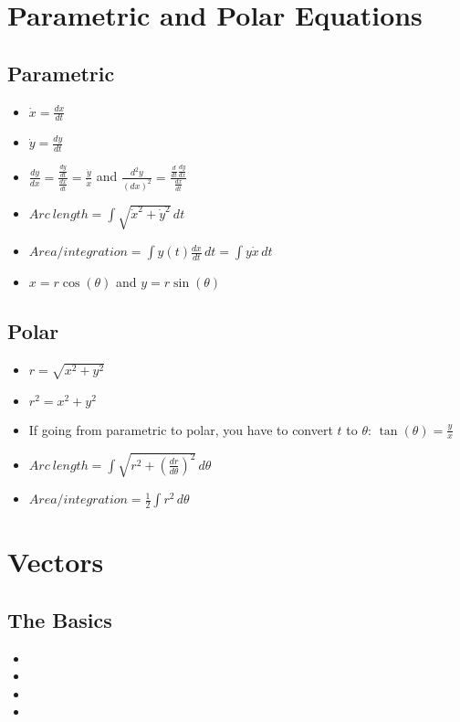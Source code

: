 \documentclass{article}
\begin{document}
\section*{Parametric and Polar Equations}
  \subsection*{Parametric}
  \begin{itemize}
   \Large \item \( \dot{x}=\frac{dx}{dt}\)\\
   \item \( \dot{y}=\frac{dy}{dt}\)\\
   \item
     \(\frac{dy}{dx}=\frac{\frac{dy}{dt}}{\frac{dx}{dt}}=\frac{\dot{y}}{\dot{x}}\) 
      and \huge
     \( \frac{d^2y}{\left(dx\right)^2} = \frac{\frac{d}{dt}\frac{dy}{dx}}{\frac{dx}{dt}} \)\\
   \normalsize
   \item \(Arc ~ length = \int\sqrt{\dot{x}^2+\dot{y}^2} \, dt\)\\
   \item \(Area/integration = \int y(t) \frac{dx}{dt} \, dt = \int y \dot{x} \, dt \)\\
   \item \(x=r\cos(\theta)\) and \(y=r\sin(\theta)\)\\
  \end{itemize}
  \subsection*{Polar}
  \begin{itemize}
   \item \(r=\sqrt{x^2+y^2}\)\\
   \item \( r^2=x^2+y^2 \)\\
   \item If going from parametric to polar, you have to convert
      \(t\) to \(\theta\): \(\tan(\theta)=\frac{y}{x}\)\\
   \item \(Arc ~ length = \int \sqrt{r^2+\left( \frac{dr}{d\theta}
     \right)^2} \, d\theta\)
   \item \(Area/integration = \frac{1}{2} \int r^2 \, d\theta \)\\
  \end{itemize}
\section*{Vectors}
  \subsection*{The Basics}
  \begin{itemize}
    \item 
    \item
    \item
    \item
  \end{itemize}
\end{document}
